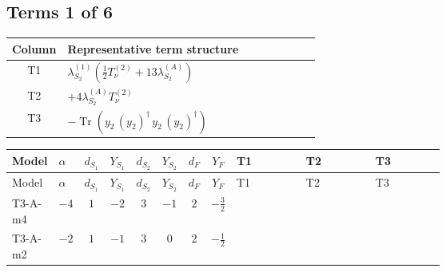 \documentclass[8pt]{article}
\begin{document}
\begin{landscape}
\subsection*{Terms 1 of 6}
\begin{center}
\begin{tabular}{@{}c >{\raggedright\arraybackslash}p{0.82\linewidth}@{}}
\toprule
Column & Representative term structure \\
\midrule
T1 & \(\displaystyle {\lambda_{S_2}^{(1)}} \left(\frac{1}{2} T_{\nu}^{(2)}+13 {\lambda_{S_2}^{(A)}}\right)\) \\
\midrule
T2 & \(\displaystyle +4 {\lambda_{S_2}^{(A)}} T_{\nu}^{(2)}\) \\
\midrule
T3 & \(\displaystyle -\operatorname{Tr}\!\left({y_2}\,\left({y_2}\right)^{\dagger}\,{y_2}\,\left({y_2}\right)^{\dagger}\right)\) \\
\midrule
\bottomrule
\end{tabular}
\end{center}
\smallskip
\tiny
\begin{longtable}{@{}llcccccc >{\raggedright\arraybackslash}p{0.21\linewidth} >{\raggedright\arraybackslash}p{0.21\linewidth} >{\raggedright\arraybackslash}p{0.21\linewidth}@{}}
\toprule
Model & $\alpha$ & $d_{S_1}$ & $Y_{S_1}$ & $d_{S_2}$ & $Y_{S_2}$ & $d_F$ & $Y_F$ & T1 & T2 & T3 \\
\midrule
\endfirsthead
\toprule
Model & $\alpha$ & $d_{S_1}$ & $Y_{S_1}$ & $d_{S_2}$ & $Y_{S_2}$ & $d_F$ & $Y_F$ & T1 & T2 & T3 \\
\midrule
\endhead
T3-A-m4 & $-4$ & $1$ & $-2$ & $3$ & $-1$ & $2$ & $-\frac{3}{2}$ & \scriptsize\adjustbox{max width=\linewidth}{$\begin{gathered} {\lambda_{S_2}^{(1)}} \left(\frac{1}{2} T_{\nu}^{(2)}+13 {\lambda_{S_2}^{(A)}}\right)\end{gathered}$} & \scriptsize\adjustbox{max width=\linewidth}{$\begin{gathered} +4 {\lambda_{S_2}^{(A)}} T_{\nu}^{(2)}\end{gathered}$} & \scriptsize\adjustbox{max width=\linewidth}{$\begin{gathered} -\operatorname{Tr}\!\left({y_2}\,\left({y_2}\right)^{\dagger}\,{y_2}\,\left({y_2}\right)^{\dagger}\right)\end{gathered}$} \\
\midrule
T3-A-m2 & $-2$ & $1$ & $-1$ & $3$ & $0$ & $2$ & $-\frac{1}{2}$ & \scriptsize\adjustbox{max width=\linewidth}{$\begin{gathered} {\lambda_{S_2}^{(1)}} \left(\frac{1}{2} T_{\nu}^{(2)}+13 {\lambda_{S_2}^{(A)}}\right)\end{gathered}$} & \scriptsize\adjustbox{max width=\linewidth}{$\begin{gathered} +4 {\lambda_{S_2}^{(A)}} T_{\nu}^{(2)}\end{gathered}$} & \scriptsize\adjustbox{max width=\linewidth}{$\begin{gathered} -\operatorname{Tr}\!\left({y_2}\,\left({y_2}\right)^{\dagger}\,{y_2}\,\left({y_2}\right)^{\dagger}\right)\end{gathered}$} \\

\end{longtable}
\end{landscape}
\end{document}
